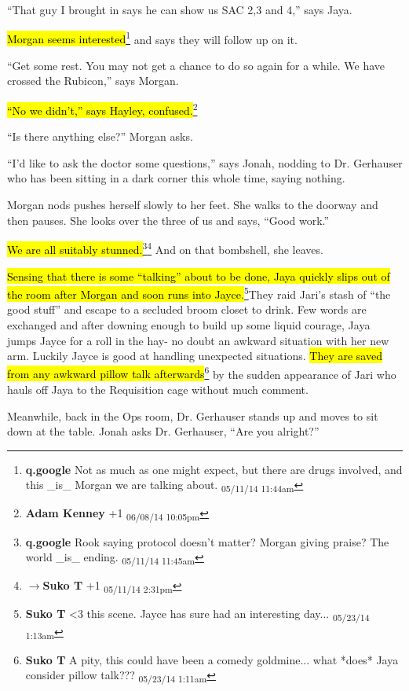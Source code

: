 ``That guy I brought in says he can show us SAC 2,3 and 4,'' says Jaya.

\hl{Morgan seems interested}\footnote{\textbf{q.google }Not as much as one might expect, but there are drugs involved, and this \_is\_ Morgan we are talking about. \textsubscript{05/11/14 11:44am}} and says they will follow up on it.

``Get some rest.  You may not get a chance to do so again for a while.  We have crossed the Rubicon,'' says Morgan.

\hl{``No we didn't,'' says Hayley, confused.}\footnote{\textbf{Adam Kenney }+1 \textsubscript{06/08/14 10:05pm}}

``Is there anything else?'' Morgan asks.

``I'd like to ask the doctor some questions,'' says Jonah, nodding to Dr. Gerhauser who has been sitting in a dark corner this whole time, saying nothing.

Morgan nods pushes herself slowly to her feet.  She walks to the doorway and then pauses.  She looks over the three of us and says, ``Good work.''

\hl{We are all suitably stunned.}\footnote{\textbf{q.google }Rook saying protocol doesn't matter?  Morgan giving praise?  The world \_is\_ ending. \textsubscript{05/11/14 11:45am}}\footnote{$\rightarrow$\textbf{Suko T }+1 \textsubscript{05/11/14 2:31pm}}  And on that bombshell, she leaves.



\hl{Sensing that there is some ``talking'' about to be done, Jaya quickly slips out of the room after Morgan and soon runs into Jayce.}\footnote{\textbf{Suko T }\textless 3 this scene.  Jayce has sure had an interesting day... \textsubscript{05/23/14 1:13am}}They raid Jari's stash of ``the good stuff'' and escape to a secluded broom closet to drink.  Few words are exchanged and after downing enough to build up some liquid courage, Jaya jumps Jayce for a roll in the hay- no doubt an awkward situation with her new arm.  Luckily Jayce is good at handling unexpected situations.  \hl{They are saved from any awkward pillow talk afterwards}\footnote{\textbf{Suko T }A pity, this could have been a comedy goldmine... what *does* Jaya consider pillow talk??? \textsubscript{05/23/14 1:11am}} by the sudden appearance of Jari who hauls off Jaya to the Requisition cage without much comment.



Meanwhile, back in the Ops room, Dr. Gerhauser stands up and moves to sit down at the table.  Jonah asks Dr. Gerhauser, ``Are you alright?''

